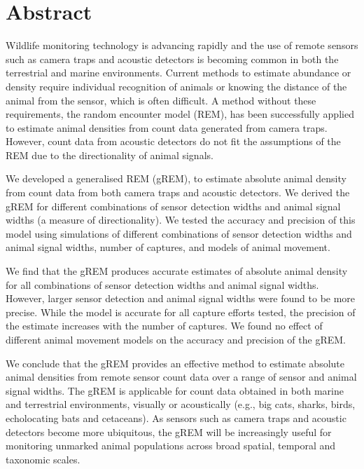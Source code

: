 









\section{Abstract}
Wildlife monitoring technology is advancing rapidly and the use of remote sensors such as camera traps and acoustic detectors is becoming common in both the terrestrial and marine environments.
Current methods to estimate abundance or density require individual recognition of animals or knowing the distance of the animal from the sensor, which is often difficult.
A method without these requirements, the random encounter model (REM), has been successfully applied to estimate animal densities from count data generated from camera traps.
However, count data from acoustic detectors do not fit the assumptions of the REM due to the directionality of animal signals.

We developed a generalised REM (gREM), to estimate absolute animal density from count data from both camera traps and acoustic detectors.
We derived the gREM for different combinations of sensor detection widths and animal signal widths (a measure of directionality).
We tested the accuracy and precision of this model using simulations of different combinations of sensor detection widths and animal signal widths, number of captures, and models of animal movement. 

We find that the gREM produces accurate estimates of absolute animal density for all combinations of sensor detection widths and animal signal widths.
However, larger sensor detection and animal signal widths were found to be more precise.
While the model is accurate for all capture efforts tested, the precision of the estimate increases with the number of captures.
We found no effect of different animal movement models on the accuracy and precision of the gREM.  

We conclude that the gREM provides an effective method to estimate absolute animal densities from remote sensor count data over a range of sensor and animal signal widths.
The gREM is applicable for count data obtained in both marine and terrestrial environments, visually or acoustically (e.g., big cats, sharks, birds, echolocating bats and cetaceans).
As sensors such as camera traps and acoustic detectors become more ubiquitous, the gREM will be increasingly useful for monitoring unmarked animal populations across broad spatial, temporal and taxonomic scales. 

